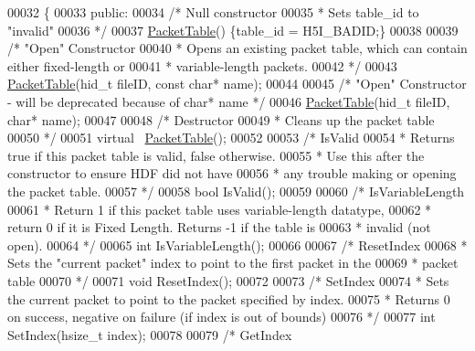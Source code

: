 \begin{DoxyCode}
00032 \{
00033 \textcolor{keyword}{public}:
00034     \textcolor{comment}{/* Null constructor}
00035 \textcolor{comment}{     * Sets table\_id to "invalid"}
00036 \textcolor{comment}{     */}
00037     \hyperlink{class_packet_table}{PacketTable}() \{table\_id = H5I\_BADID;\}
00038 
00039     \textcolor{comment}{/* "Open" Constructor}
00040 \textcolor{comment}{     * Opens an existing packet table, which can contain either fixed-length or}
00041 \textcolor{comment}{     * variable-length packets.}
00042 \textcolor{comment}{     */}
00043     \hyperlink{class_packet_table}{PacketTable}(hid\_t fileID, \textcolor{keyword}{const} \textcolor{keywordtype}{char}* name);
00044 
00045     \textcolor{comment}{/* "Open" Constructor - will be deprecated because of char* name */}
00046     \hyperlink{class_packet_table}{PacketTable}(hid\_t fileID, \textcolor{keywordtype}{char}* name);
00047 
00048     \textcolor{comment}{/* Destructor}
00049 \textcolor{comment}{     * Cleans up the packet table}
00050 \textcolor{comment}{     */}
00051     \textcolor{keyword}{virtual} ~\hyperlink{class_packet_table}{PacketTable}();
00052 
00053     \textcolor{comment}{/* IsValid}
00054 \textcolor{comment}{     * Returns true if this packet table is valid, false otherwise.}
00055 \textcolor{comment}{     * Use this after the constructor to ensure HDF did not have}
00056 \textcolor{comment}{     * any trouble making or opening the packet table.}
00057 \textcolor{comment}{     */}
00058     \textcolor{keywordtype}{bool} IsValid();
00059 
00060     \textcolor{comment}{/* IsVariableLength}
00061 \textcolor{comment}{     * Return 1 if this packet table uses variable-length datatype,}
00062 \textcolor{comment}{     * return 0 if it is Fixed Length.  Returns -1 if the table is}
00063 \textcolor{comment}{     * invalid (not open).}
00064 \textcolor{comment}{     */}
00065     \textcolor{keywordtype}{int} IsVariableLength();
00066 
00067     \textcolor{comment}{/* ResetIndex}
00068 \textcolor{comment}{     * Sets the "current packet" index to point to the first packet in the}
00069 \textcolor{comment}{     * packet table}
00070 \textcolor{comment}{     */}
00071     \textcolor{keywordtype}{void} ResetIndex();
00072 
00073     \textcolor{comment}{/* SetIndex}
00074 \textcolor{comment}{     * Sets the current packet to point to the packet specified by index.}
00075 \textcolor{comment}{     * Returns 0 on success, negative on failure (if index is out of bounds)}
00076 \textcolor{comment}{     */}
00077     \textcolor{keywordtype}{int} SetIndex(hsize\_t index);
00078 
00079     \textcolor{comment}{/* GetIndex}

\end{DoxyCode}
